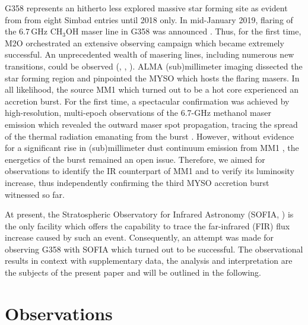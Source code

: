 \documentclass[longauth,usenatbib]{aa}
\begin{document}
G358 represents an hitherto less explored massive star forming site as evident from from eight Simbad entries until 2018 only.
In mid-January 2019, flaring of the 6.7\,GHz CH$_3$OH maser line in G358 was announced . Thus, for the first time, M2O orchestrated an extensive observing campaign which became extremely successful. An unprecedented wealth of masering lines, including numerous new transitions, could be observed (, , ). ALMA (sub)millimeter imaging dissected the star forming region and pinpointed the MYSO which hosts the flaring masers. In all likelihood, the source MM1 which turned out to be a hot core experienced an accretion burst. For the first time, a spectacular confirmation was achieved by high-resolution, multi-epoch observations of the 6.7-GHz methanol maser emission which revealed the outward maser spot propagation, tracing the spread of the thermal radiation emanating from the burst .
However, without evidence for a significant rise in (sub)millimeter dust continuum emission from
MM1 , the energetics of the burst remained an open issue. Therefore, we aimed for observations to identify the IR counterpart of MM1 and to verify its luminosity increase, thus independently confirming the third MYSO accretion burst witnessed so far. 

At present, the Stratospheric Observatory for Infrared Astronomy (SOFIA, ) is the only facility which offers the capability to trace the far-infrared (FIR) flux increase caused by such an event. Consequently, an attempt was made for observing G358 with SOFIA which turned out to be successful. The observational results in context with supplementary data, the analysis and interpretation are the subjects of the present paper and will be outlined in the following.
\section{Observations}\label{obs}
\end{document}
